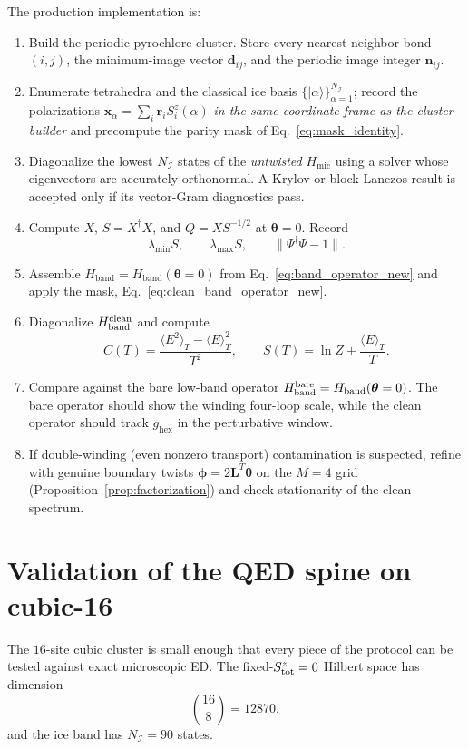 \documentclass[11pt,letterpaper]{article}
\newcommand{\ghex}{g_{\mathrm{hex}}}
\newcommand{\bd}{\bm d}
\newcommand{\bn}{\bm n}
\newcommand{\bL}{\bm L}
\newcommand{\br}{\bm r}
\newcommand{\bphi}{\bm \phi}
\newcommand{\btheta}{\bm \theta}
\newcommand{\ice}{\mathcal I}
\newcommand{\HB}{H_{\mathrm{band}}}
\newcommand{\Hmic}{H_{\mathrm{mic}}}
\theoremstyle{plain}
\theoremstyle{definition}
\begin{document}
The production implementation is:
\begin{enumerate}
\item Build the periodic pyrochlore cluster.  Store every nearest-neighbor
bond $(i,j)$, the minimum-image vector $\bd_{ij}$, and the periodic image
integer $\bn_{ij}$.
\item Enumerate tetrahedra and the classical ice basis
$\{|\alpha\rangle\}_{\alpha=1}^{N_\ice}$; record the polarizations
$\bm x_\alpha=\sum_i\br_i S_i^z(\alpha)$ \emph{in the same coordinate frame
as the cluster builder} and precompute the parity mask of
Eq.~\eqref{eq:mask_identity}.
\item Diagonalize the lowest $N_\ice$ states of the \emph{untwisted}
$\Hmic$ using a solver whose eigenvectors are accurately orthonormal.  A
Krylov or block-Lanczos result is accepted only if its vector-Gram
diagnostics pass.
\item Compute $X$, $S=X^\dagger X$, and $Q=XS^{-1/2}$ at $\btheta=0$.  Record
\[
\lambda_{\min}S,\qquad
\lambda_{\max}S,\qquad
\|\Psi^\dagger\Psi-1\|.
\]
\item Assemble $\HB=\HB(\btheta=0)$ from Eq.~\eqref{eq:band_operator_new}
and apply the mask, Eq.~\eqref{eq:clean_band_operator_new}.
\item Diagonalize $\HB^{\rm clean}$ and compute
\[
C(T)=\frac{\langle E^2\rangle_T-\langle E\rangle_T^2}{T^2},
\qquad
S(T)=\ln Z+\frac{\langle E\rangle_T}{T}.
\]
\item Compare against the bare low-band operator
$\HB^{\rm bare}=\HB(\btheta=0)$.  The bare operator should show the winding
four-loop scale, while the clean operator should track $\ghex$ in the
perturbative window.
\item If double-winding (even nonzero transport) contamination is suspected,
refine with genuine boundary twists $\bphi=2\bL^{T}\btheta$ on the $M=4$
grid (Proposition~\ref{prop:factorization}) and check stationarity of the
clean spectrum.
\end{enumerate}

\section{Validation of the QED spine on cubic-16}
\label{sec:qed_validation_new}

The $16$-site cubic cluster is small enough that every piece of the protocol
can be tested against exact microscopic ED.  The fixed-$S^z_{\rm tot}=0$
Hilbert space has dimension
\[
\binom{16}{8}=12870,
\]
and the ice band has $N_\ice=90$ states.
\end{document}

